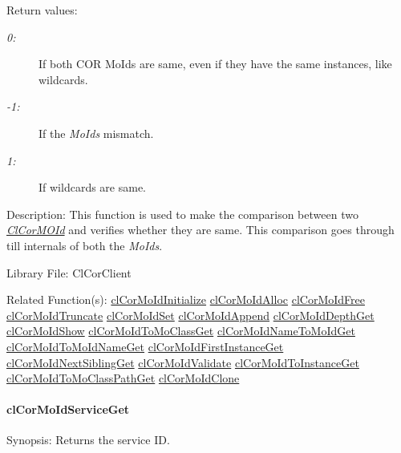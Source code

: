 \begin{Desc}
\item[Return values:]
\begin{description}
\item[{\em 0:}]If both COR Mo\-Ids are same, even if they have the same instances, like wildcards. \item[{\em -1:}]If the {\em Mo\-Ids\/} mismatch. \item[{\em 1:}]If wildcards are same.\end{description}
\end{Desc}
\begin{Desc}
\item[Description:]This function is used to make the comparison between two {\em \hyperlink{struct_cl_cor_m_o_id}{Cl\-Cor\-MOId}\/} and verifies whether they are same. This comparison goes through till internals of both the {\em Mo\-Ids\/}.\end{Desc}
\begin{Desc}
\item[Library File:]Cl\-Cor\-Client\end{Desc}
\begin{Desc}
\item[Related Function(s):]\hyperlink{group__group13}{cl\-Cor\-Mo\-Id\-Initialize} \hyperlink{group__group13}{cl\-Cor\-Mo\-Id\-Alloc} \hyperlink{group__group13}{cl\-Cor\-Mo\-Id\-Free} \hyperlink{group__group13}{cl\-Cor\-Mo\-Id\-Truncate} \hyperlink{group__group13}{cl\-Cor\-Mo\-Id\-Set} \hyperlink{group__group13}{cl\-Cor\-Mo\-Id\-Append} \hyperlink{group__group13}{cl\-Cor\-Mo\-Id\-Depth\-Get} \hyperlink{group__group13}{cl\-Cor\-Mo\-Id\-Show} \hyperlink{group__group13}{cl\-Cor\-Mo\-Id\-To\-Mo\-Class\-Get} \hyperlink{group__group13}{cl\-Cor\-Mo\-Id\-Name\-To\-Mo\-Id\-Get} \hyperlink{group__group13}{cl\-Cor\-Mo\-Id\-To\-Mo\-Id\-Name\-Get} \hyperlink{group__group13}{cl\-Cor\-Mo\-Id\-First\-Instance\-Get} \hyperlink{group__group13}{cl\-Cor\-Mo\-Id\-Next\-Sibling\-Get} \hyperlink{group__group13}{cl\-Cor\-Mo\-Id\-Validate} \hyperlink{group__group13}{cl\-Cor\-Mo\-Id\-To\-Instance\-Get} \hyperlink{group__group13}{cl\-Cor\-Mo\-Id\-To\-Mo\-Class\-Path\-Get} \hyperlink{group__group13}{cl\-Cor\-Mo\-Id\-Clone} \end{Desc}
\hypertarget{pagecor246}{}\paragraph{cl\-Cor\-Mo\-Id\-Service\-Get}\label{pagecor246}
\begin{Desc}
\item[Synopsis:]Returns the service ID.\end{Desc}

